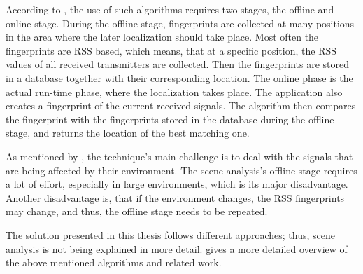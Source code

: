 According to \citet{IEEE:survey_wireless_indoor_pos}, the use of such algorithms requires two stages, the offline and online stage. During the offline stage, fingerprints are collected at many positions in the area where the later localization should take place. Most often the fingerprints are \ac{RSS} based, which means, that at a specific position, the \ac{RSS} values of all received transmitters are collected. Then the fingerprints are stored in a database together with their corresponding location. The online phase is the actual run-time phase, where the localization takes place. The application also creates a fingerprint of the current received signals. The algorithm then compares the fingerprint with the fingerprints stored in the database during the offline stage, and returns the location of the best matching one.

As mentioned by \citet{IEEE:survey_wireless_indoor_pos}, the technique's main challenge is to deal with the signals that are being affected by their environment. The scene analysis's offline stage requires a lot of effort, especially in large environments, which is its major disadvantage. Another disadvantage is, that if the environment changes, the \ac{RSS} fingerprints may change, and thus, the offline stage needs to be repeated.

The solution presented in this thesis follows different approaches; thus, scene analysis is not being explained in more detail. \citet{IEEE:survey_wireless_indoor_pos} gives a more detailed overview of the above mentioned algorithms and related work.
